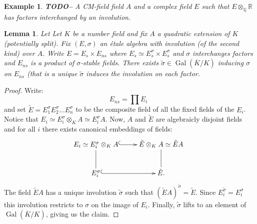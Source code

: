 \documentclass{article}
\theoremstyle{plain}
\newtheorem{lemma}[theorem]{Lemma}
\newtheorem{example}[theorem]{Example}
\theoremstyle{definition}
\numberwithin{equation}{section}
\DeclareMathOperator{\Gal}{Gal}
\newcommand{\RR}{\mathbb{R}}
\newcommand{\QQ}{\mathbb{Q}}
\newcommand{\TODO}[1]{\textbf{TODO-#1}}
\begin{document}
\begin{example}
\TODO - A CM-field field $A$ and a complex field $E$ such that $E\otimes_\QQ \RR$ has factors interchanged by an involution.
\end{example}


\begin{lemma}\label{Lem:liftsigma}
Let Let $K$ be a number field and fix $A$ a quadratic extension of $K$ (potentially split).
Fix $(E,\sigma)$ an \'etale algebra with involution (of the second kind) over $A$.
Write $E = E_s \times E_{ns}$ where $E_s \simeq E_s^\sigma \times E_s^\sigma$ and $\sigma$ interchanges factors and $E_{ns}$ is a product of $\sigma$-stable fields.
There exists $\tilde{\sigma} \in \Gal(\overline{K}/K)$ inducing $\sigma$ on $E_{ns}$ (that is a unique $\tilde{\sigma}$ induces the involution on each factor.
\end{lemma}
\begin{proof}
Write:
\[ E_{ns} = \prod E_i \]
and set $\tilde{E} = E_1^\sigma E_2^\sigma\ldots E_{n}^\sigma$ to be the composite field of all the fixed fields of the $E_i$.
Notice that $E_i \simeq E_i^\sigma\otimes_K A \simeq E_i^\sigma A$.
Now, $A$ and $\tilde{E}$ are algebraicly disjoint fields and for all $i$ there exists canonical embeddings of fields:
\[ \xymatrix{ E_i \simeq E_i^\sigma\otimes_K A \ar@{^(->}[r]\ar@{-}[d] &  \tilde{E} \otimes_K A \simeq \tilde{E}A \ar@{-}[d] \\ 
                      E_i^\sigma \ar@{^(->}[r]\ar@{-} & \tilde{E}.}
 \]
The field $\tilde{E}A$ has a unique involution $\tilde{\sigma}$ such that $(\tilde{E}A)^{\tilde{\sigma}} = \tilde{E}$. Since $E_i^{\tilde{\sigma}} = E_i^\sigma$ this involution restricts to $\sigma$ on the image of $E_i$.
Finally, $\tilde{\sigma}$ lifts to an element of $\Gal(\overline{K}/K)$, giving us the claim.
\end{proof}
\end{document}
